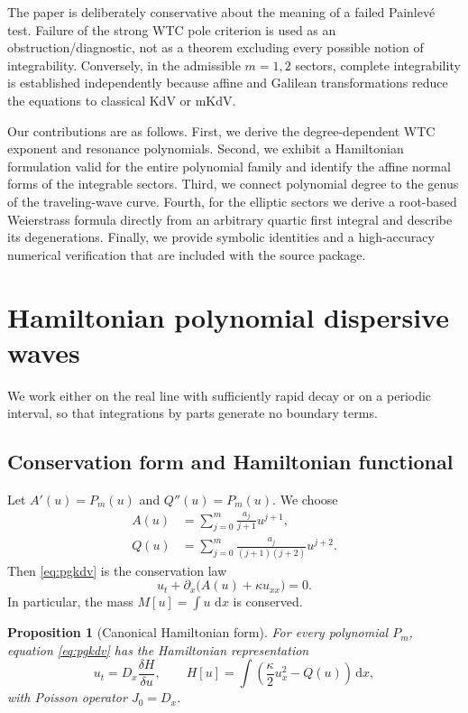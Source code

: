 \documentclass[11pt]{article}
\newtheorem{proposition}[theorem]{Proposition}
\newcommand{\dd}{\,\mathrm{d}}
\newcommand{\Dx}{D_x}
\begin{document}
The paper is deliberately conservative about the meaning of a failed Painlev\'e test.  Failure of the strong WTC pole criterion is used as an obstruction/diagnostic, not as a theorem excluding every possible notion of integrability.  Conversely, in the admissible $m=1,2$ sectors, complete integrability is established independently because affine and Galilean transformations reduce the equations to classical KdV or mKdV.

Our contributions are as follows.  First, we derive the degree-dependent WTC exponent and resonance polynomials.  Second, we exhibit a Hamiltonian formulation valid for the entire polynomial family and identify the affine normal forms of the integrable sectors.  Third, we connect polynomial degree to the genus of the traveling-wave curve.  Fourth, for the elliptic sectors we derive a root-based Weierstrass formula directly from an arbitrary quartic first integral and describe its degenerations.  Finally, we provide symbolic identities and a high-accuracy numerical verification that are included with the source package.

\section{Hamiltonian polynomial dispersive waves}
We work either on the real line with sufficiently rapid decay or on a periodic interval, so that integrations by parts generate no boundary terms.

\subsection{Conservation form and Hamiltonian functional}
Let $A'(u)=P_m(u)$ and $Q''(u)=P_m(u)$.  We choose
\begin{align}
 A(u)&=\sum_{j=0}^{m}\frac{a_j}{j+1}u^{j+1},\\
 Q(u)&=\sum_{j=0}^{m}\frac{a_j}{(j+1)(j+2)}u^{j+2}.
 \label{eq:AQ}
\end{align}
Then \eqref{eq:pgkdv} is the conservation law
\begin{equation}
 u_t+\partial_x\bigl(A(u)+\kappa u_{xx}\bigr)=0.
 \label{eq:conservation}
\end{equation}
In particular, the mass $M[u]=\int u\,\dd x$ is conserved.

\begin{proposition}[Canonical Hamiltonian form]
For every polynomial $P_m$, equation \eqref{eq:pgkdv} has the Hamiltonian representation
\begin{equation}
 u_t=\Dx\frac{\delta H}{\delta u},
 \qquad
 H[u]=\int\left(\frac{\kappa}{2}u_x^2-Q(u)\right)\dd x,
 \label{eq:ham}
\end{equation}
with Poisson operator $J_0=\Dx$.
\end{proposition}
\end{document}
